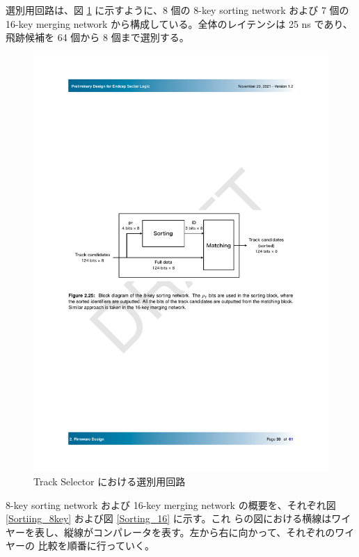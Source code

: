 選別用回路は、図 \ref{TrackSelector} に示すように、8 個の 8-key sorting network および 7 個の 16-key merging network から構成している。全体のレイテンシは 25 ns であり、飛跡候補を 64 個から 8 個まで選別する。

\begin{figure} 
    \centering
    \includegraphics[width=16cm]{fig/SL/TrackSelector.pdf}
    \caption[Track Selector における選別用回路]{Track Selector における選別用回路}
    \label{TrackSelector}
\end{figure}

8-key sorting network および 16-key merging network の概要を、それぞれ図 \ref{Sortiing_8key} および図 \ref{Sorting_16} に示す。これ らの図における横線はワイヤーを表し、縦線がコンパレータを表す。左から右に向かって、それぞれのワイヤーの 比較を順番に行っていく。

